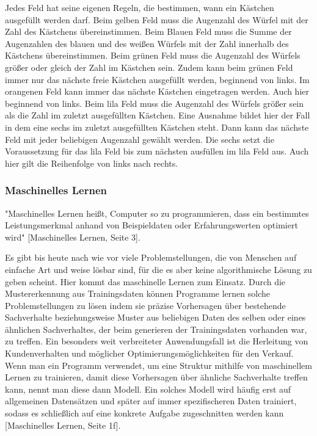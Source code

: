 Jedes Feld hat seine eigenen Regeln, die bestimmen, wann ein Kästchen ausgefüllt werden darf. Beim gelben Feld muss die Augenzahl des Würfel mit der Zahl des Kästchens übereinstimmen. Beim Blauen Feld muss die Summe der Augenzahlen des blauen und des weißen Würfels mit der Zahl innerhalb des Kästchens übereinstimmen. Beim grünen Feld muss die Augenzahl des Würfels größer oder gleich der Zahl im Kästchen sein. Zudem kann beim grünen Feld immer nur das nächste freie Kästchen ausgefüllt werden, beginnend von links. Im orangenen Feld kann immer das nächste Kästchen eingetragen werden. Auch hier beginnend von links. Beim lila Feld muss die Augenzahl des Würfels größer sein als die Zahl im zuletzt ausgefüllten Kästchen. Eine Ausnahme bildet hier der Fall in dem eine sechs im zuletzt ausgefüllten Kästchen steht. Dann kann das nächste Feld mit jeder beliebigen Augenzahl gewählt werden. Die sechs setzt die Voraussetzung für das lila Feld bis zum nächsten ausfüllen im lila Feld aus. Auch hier gilt die Reihenfolge von links nach rechts.
\subsubsection{Maschinelles Lernen}
"Maschinelles Lernen heißt, Computer so zu programmieren, dass ein bestimmtes Leistungsmerkmal anhand von Beispieldaten oder Erfahrungswerten optimiert wird" [Maschinelles Lernen, Seite 3].

Es gibt bis heute nach wie vor viele Problemstellungen, die von Menschen auf einfache Art und weise lösbar sind, für die es aber keine algorithmische Lösung zu geben scheint. Hier kommt das maschinelle Lernen zum Einsatz. Durch die Mustererkennung aus Trainingsdaten können Programme lernen solche Problemstellungen zu lösen indem sie präzise Vorhersagen über bestehende Sachverhalte beziehungsweise Muster aus beliebigen Daten des selben oder eines ähnlichen Sachverhaltes, der beim generieren der Trainingsdaten vorhanden war, zu treffen. Ein besonders weit verbreiteter Anwendungsfall ist die Herleitung von Kundenverhalten und möglicher Optimierungsmöglichkeiten für den Verkauf. Wenn man ein Programm verwendet, um eine Struktur mithilfe von maschinellem Lernen zu trainieren, damit diese Vorhersagen über ähnliche Sachverhalte treffen kann, nennt man diese dann Modell. Ein solches Modell wird häufig erst auf allgemeinen Datensätzen und später auf immer spezifischeren Daten trainiert, sodass es schließlich auf eine konkrete Aufgabe zugeschnitten werden kann [Maschinelles Lernen, Seite 1f].

